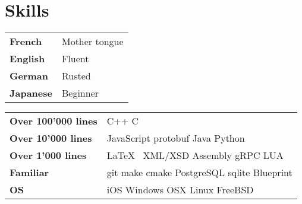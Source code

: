 \documentclass[a4paper]{deedy-resume} %
\begin{document}
\sectionspace


\section{Skills}

\begin{minipage}[t]{0.33\textwidth} %


\begin{tabular}{ll}
\textbf{French} & Mother tongue \\
\textbf{English} & Fluent \\
\textbf{German} & Rusted \\
\textbf{Japanese} & Beginner \\
\end{tabular}

\sectionspace

\end{minipage}
\hfill

\begin{minipage}[t]{0.66\textwidth} %


\begin{tabular}{ll}
\textbf{Over 100'000 lines} & C++ \textbullet{} C \\
\textbf{Over 10'000 lines} & JavaScript \textbullet{} protobuf
\textbullet{} Java \textbullet{} Python \\
\textbf{Over 1'000 lines} & \textbullet{} \LaTeX\ \textbullet{}
XML/XSD \textbullet{} Assembly \textbullet{} gRPC \textbullet{} LUA \\
\textbf{Familiar} & git \textbullet{} make \textbullet{} cmake \textbullet{}
PostgreSQL \textbullet{} sqlite \textbullet{} Blueprint \\
\textbf{OS} & iOS \textbullet{} Windows \textbullet{} OSX \textbullet{} Linux
\textbullet{} FreeBSD \\
\end{tabular}

\sectionspace

\end{minipage}
\end{document}
